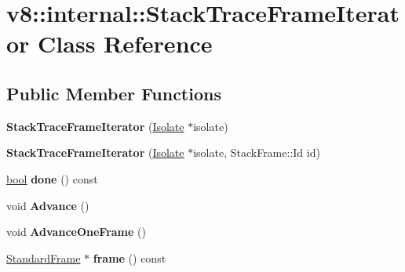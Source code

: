 \hypertarget{classv8_1_1internal_1_1StackTraceFrameIterator}{}\section{v8\+:\+:internal\+:\+:Stack\+Trace\+Frame\+Iterator Class Reference}
\label{classv8_1_1internal_1_1StackTraceFrameIterator}
\subsection*{Public Member Functions}
\begin{DoxyCompactItemize}
\item 
\mbox{\label{classv8_1_1internal_1_1StackTraceFrameIterator_a327aa85383042c2d829611adc885193f}} 
{\bfseries Stack\+Trace\+Frame\+Iterator} (\mbox{\hyperlink{classv8_1_1internal_1_1Isolate}{Isolate}} $\ast$isolate)
\item 
\mbox{\label{classv8_1_1internal_1_1StackTraceFrameIterator_ab3e8aebee3e479d42c89069aee31146f}} 
{\bfseries Stack\+Trace\+Frame\+Iterator} (\mbox{\hyperlink{classv8_1_1internal_1_1Isolate}{Isolate}} $\ast$isolate, Stack\+Frame\+::\+Id id)
\item 
\mbox{\label{classv8_1_1internal_1_1StackTraceFrameIterator_afa9eb8bfc67ead486d0ba932de930400}} 
\mbox{\hyperlink{classbool}{bool}} {\bfseries done} () const
\item 
\mbox{\label{classv8_1_1internal_1_1StackTraceFrameIterator_a37046bd215d8c31c8fa5c92a80808732}} 
void {\bfseries Advance} ()
\item 
\mbox{\label{classv8_1_1internal_1_1StackTraceFrameIterator_a013b64eacd6507cbc44053b0b0ac39f7}} 
void {\bfseries Advance\+One\+Frame} ()
\item 
\mbox{\label{classv8_1_1internal_1_1StackTraceFrameIterator_a0455561ffba6fee0b93116217d58c528}} 
\mbox{\hyperlink{classv8_1_1internal_1_1StandardFrame}{Standard\+Frame}} $\ast$ {\bfseries frame} () const

\end{DoxyCompactItemize}

